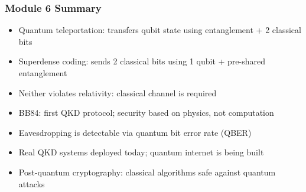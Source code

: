 \begin{frame}[fragile]\frametitle{Module 6 Summary}
\begin{itemize}
\item Quantum teleportation: transfers qubit state using entanglement + 2 classical bits
\item Superdense coding: sends 2 classical bits using 1 qubit + pre-shared entanglement
\item Neither violates relativity: classical channel is required
\item BB84: first QKD protocol; security based on physics, not computation
\item Eavesdropping is detectable via quantum bit error rate (QBER)
\item Real QKD systems deployed today; quantum internet is being built
\item Post-quantum cryptography: classical algorithms safe against quantum attacks
\end{itemize}
\end{frame}
